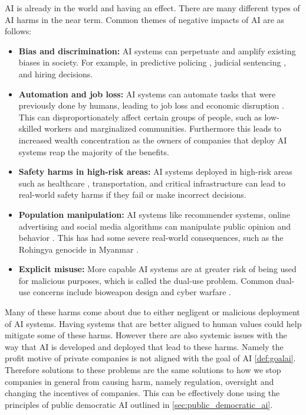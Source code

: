 AI is already in the world and having an effect. There are many different types of AI harms in the near term. Common themes of negative impacts of AI are as follows:
\begin{itemize}
    \item \textbf{Bias and discrimination: } AI systems can perpetuate and amplify existing biases in society. For example, in predictive policing \cite{stroudAutomatedPolicingProgram2021}, judicial sentencing \cite{juliaangwinMachineBias2016}, and hiring decisions.
    \item \textbf{Automation and job loss: } AI systems can automate tasks that were previously done by humans, leading to job loss and economic disruption \cite{autorWhyAreThere2015}. This can disproportionately affect certain groups of people, such as low-skilled workers and marginalized communities. Furthermore this leads to increased wealth concentration as the owners of companies that deploy AI systems reap the majority of the benefits.
    \item \textbf{Safety harms in high-risk areas: } AI systems deployed in high-risk areas such as healthcare \cite{obermeyerDissectingRacialBias2019}, transportation, and critical infrastructure can lead to real-world safety harms if they fail or make incorrect decisions.
    \item \textbf{Population manipulation: } AI systems like recommender systems, online advertising and social media algorithms can manipulate public opinion and behavior \cite{shoshanazuboffAgeSurveillanceCapitalism2017,allcottSocialMediaFake2017}. This has had some severe real-world consequences, such as the Rohingya genocide in Myanmar \cite{UN_HRC_39_CRP2_2018}.
    \item \textbf{Explicit misuse: } More capable AI systems are at greater risk of being used for malicious purposes, which is called the dual-use problem. Common dual-use concerns include bioweapon design and cyber warfare \cite{TacklingPerilsDual2022,sandbrinkArtificialIntelligenceBiological2023}.
\end{itemize}

Many of these harms come about due to either negligent or malicious deployment of AI systems. Having systems that are better aligned to human values could help mitigate some of these harms. However there are also systemic issues with the way that AI is developed and deployed that lead to these harms. Namely the profit motive of private companies is not aligned with the goal of AI \ref{def:goalai}. Therefore solutions to these problems are the same solutions to how we stop companies in general from causing harm, namely regulation, oversight and changing the incentives of companies. This can be effectively done using the principles of public democratic AI outlined in \ref{sec:public_democratic_ai}.


